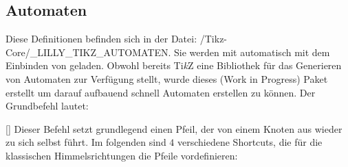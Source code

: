 %
%
%
%
%

\subsection{Automaten }
Diese Definitionen befinden sich in der Datei: {\ltt\LILLYxPATHxGRAPHICS/Tikz-Core/\_LILLY\_TIKZ\_AUTOMATEN}. Sie werden mit  automatisch mit dem Einbinden von\newline {} geladen.\medskip\newline
Obwohl bereits Ti\textit{k}Z eine Bibliothek für das Generieren von Automaten zur Verfügung stellt, wurde dieses (Work in Progress) Paket erstellt um darauf aufbauend schnell Automaten erstellen zu können. Der Grundbefehl lautet:

%
%
%

[]
Dieser Befehl setzt grundlegend einen Pfeil, der von einem Knoten aus wieder zu sich selbst führt. Im folgenden sind $4$ verschiedene Shortcuts, die für die klassischen Himmelsrichtungen die Pfeile vordefinieren:

%
%
%

